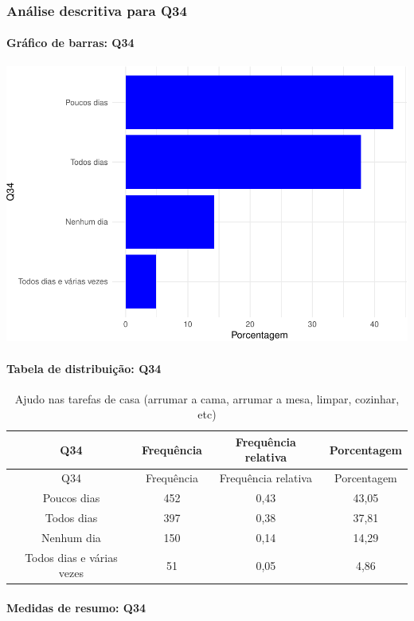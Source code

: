 \documentclass[]{article}
\let\oldparagraph\paragraph
\renewcommand{\paragraph}[1]{\oldparagraph{#1}\mbox{}}
\begin{document}
\hypertarget{anuxe1lise-descritiva-para-q34}{%
\subsubsection{Análise descritiva para Q34}\label{anuxe1lise-descritiva-para-q34}}

\hypertarget{gruxe1fico-de-barras-q34}{%
\paragraph{Gráfico de barras: Q34}\label{gruxe1fico-de-barras-q34}}

\begin{center}\includegraphics[width=0.75\linewidth]{relatorio_covid19_files/figure-latex/unnamed-chunk-1190-1} \end{center}

\hypertarget{tabela-de-distribuiuxe7uxe3o-q34}{%
\paragraph{Tabela de distribuição: Q34}\label{tabela-de-distribuiuxe7uxe3o-q34}}

\begin{longtable}[]{@{}cccc@{}}
\caption{\label{tab:unnamed-chunk-1191}Ajudo nas tarefas de casa (arrumar a cama, arrumar a mesa, limpar, cozinhar, etc)}\tabularnewline
\toprule
Q34 & Frequência & Frequência relativa & Porcentagem\tabularnewline
\midrule
\endfirsthead
\toprule
Q34 & Frequência & Frequência relativa & Porcentagem\tabularnewline
\midrule
\endhead
Poucos dias & 452 & 0,43 & 43,05\tabularnewline
Todos dias & 397 & 0,38 & 37,81\tabularnewline
Nenhum dia & 150 & 0,14 & 14,29\tabularnewline
Todos dias e várias vezes & 51 & 0,05 & 4,86\tabularnewline
\bottomrule
\end{longtable}

\hypertarget{medidas-de-resumo-q34}{%
\paragraph{Medidas de resumo: Q34}\label{medidas-de-resumo-q34}}
\end{document}

